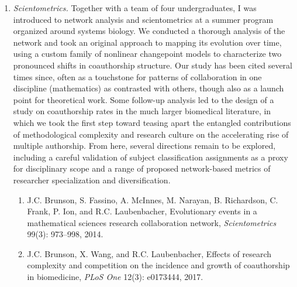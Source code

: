 \documentclass{nihbiosketch}
\begin{document}
\begin{enumerate}

\item \emph{Scientometrics.}
Together with a team of four undergraduates, I was introduced to network analysis and scientometrics at a summer program organized around systems biology. We conducted a thorough analysis of the network and took an original approach to mapping its evolution over time, using a custom family of nonlinear changepoint models to characterize two pronounced shifts in coauthorship structure. Our study has been cited several times since, often as a touchstone for patterns of collaboration in one discipline (mathematics) as contrasted with others, though also as a launch point for theoretical work. Some follow-up analysis led to the design of a study on coauthorship rates in the much larger biomedical literature, in which we took the first step toward teasing apart the entangled contributions of methodological complexity and research culture on the accelerating rise of multiple authorship. From here, several directions remain to be explored, including a careful validation of subject classification assignments as a proxy for disciplinary scope and a range of proposed network-based metrics of researcher specialization and diversification.

\begin{enumerate}
\item J.C. Brunson, S. Fassino, A. McInnes, M. Narayan, B. Richardson, C. Frank, P. Ion, and R.C. Laubenbacher, Evolutionary events in a mathematical sciences research collaboration network, \emph{Scientometrics} 99(3): 973--998, 2014.
\item J.C. Brunson, X. Wang, and R.C. Laubenbacher, Effects of research complexity and competition on the incidence and growth of coauthorship in biomedicine, \emph{PLoS One} 12(3): e0173444, 2017.
\end{enumerate}


\end{enumerate}
\end{document}
